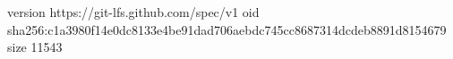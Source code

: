 version https://git-lfs.github.com/spec/v1
oid sha256:c1a3980f14e0dc8133e4be91dad706aebdc745cc8687314dcdeb8891d8154679
size 11543
